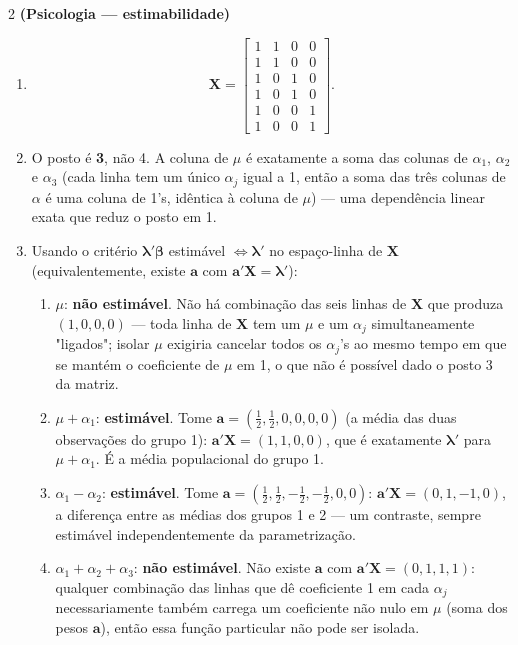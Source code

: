 \documentclass[11pt]{article}
\begin{document}
\begin{questao}{2} \textbf{(Psicologia --- estimabilidade)}
\end{questao}
\begin{solucao}
\begin{enumerate}[label=(\alph*)]
  \item
  $$
  \mathbf{X} = \begin{bmatrix}
  1 & 1 & 0 & 0 \\ 1 & 1 & 0 & 0 \\
  1 & 0 & 1 & 0 \\ 1 & 0 & 1 & 0 \\
  1 & 0 & 0 & 1 \\ 1 & 0 & 0 & 1
  \end{bmatrix}.
  $$
  \item O posto é \textbf{3}, não 4. A coluna de $\mu$ é exatamente a soma das colunas de
    $\alpha_1$, $\alpha_2$ e $\alpha_3$ (cada linha tem um único $\alpha_j$ igual a 1, então a
    soma das três colunas de $\alpha$ é uma coluna de 1's, idêntica à coluna de $\mu$) --- uma
    dependência linear exata que reduz o posto em 1.
  \item Usando o critério $\boldsymbol\lambda'\boldsymbol\beta$ estimável $\iff \boldsymbol\lambda'$
    no espaço-linha de $\mathbf{X}$ (equivalentemente, existe $\mathbf{a}$ com
    $\mathbf{a}'\mathbf{X}=\boldsymbol\lambda'$):
    \begin{enumerate}[label=(\roman*)]
      \item $\mu$: \textbf{não estimável}. Não há combinação das seis linhas de $\mathbf{X}$ que
        produza $(1,0,0,0)$ --- toda linha de $\mathbf{X}$ tem um $\mu$ e um $\alpha_j$
        simultaneamente "ligados"; isolar $\mu$ exigiria cancelar todos os $\alpha_j$'s ao mesmo
        tempo em que se mantém o coeficiente de $\mu$ em 1, o que não é possível dado o
        posto 3 da matriz.
      \item $\mu + \alpha_1$: \textbf{estimável}. Tome $\mathbf{a} = (\tfrac12, \tfrac12, 0,0,0,0)$
        (a média das duas observações do grupo 1): $\mathbf{a}'\mathbf{X} = (1,1,0,0)$, que é
        exatamente $\boldsymbol\lambda'$ para $\mu+\alpha_1$. É a média populacional do grupo 1.
      \item $\alpha_1 - \alpha_2$: \textbf{estimável}. Tome $\mathbf{a} = (\tfrac12,\tfrac12,
        -\tfrac12,-\tfrac12,0,0)$: $\mathbf{a}'\mathbf{X} = (0,1,-1,0)$, a diferença entre as
        médias dos grupos 1 e 2 --- um contraste, sempre estimável independentemente da
        parametrização.
      \item $\alpha_1+\alpha_2+\alpha_3$: \textbf{não estimável}. Não existe $\mathbf{a}$ com
        $\mathbf{a}'\mathbf{X} = (0,1,1,1)$: qualquer combinação das linhas que dê coeficiente 1
        em cada $\alpha_j$ necessariamente também carrega um coeficiente não nulo em $\mu$ (soma
        dos pesos $\mathbf{a}$), então essa função particular não pode ser isolada.
    \end{enumerate}
\end{enumerate}
\end{solucao}
\end{document}
